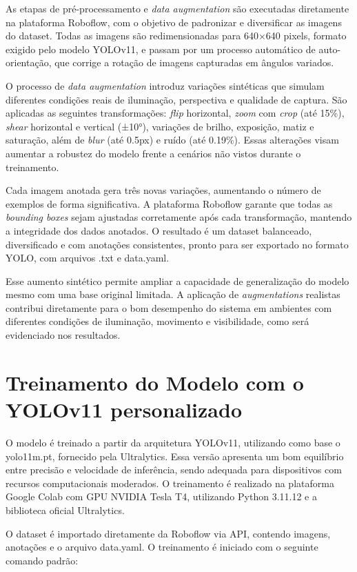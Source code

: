 As etapas de pré-processamento e \textit{data augmentation} são executadas diretamente na plataforma Roboflow, com o objetivo de padronizar e diversificar as imagens do dataset. Todas as imagens são redimensionadas para 640×640 pixels, formato exigido pelo modelo YOLOv11, e passam por um processo automático de auto-orientação, que corrige a rotação de imagens capturadas em ângulos variados.

O processo de \textit{data augmentation} introduz variações sintéticas que simulam diferentes condições reais de iluminação, perspectiva e qualidade de captura. São aplicadas as seguintes transformações: \textit{flip} horizontal, \textit{zoom} com \textit{crop} (até 15\%), \textit{shear} horizontal e vertical (±10°), variações de brilho, exposição, matiz e saturação, além de \textit{blur} (até 0.5px) e ruído (até 0.19\%). Essas alterações visam aumentar a robustez do modelo frente a cenários não vistos durante o treinamento.

Cada imagem anotada gera três novas variações, aumentando o número de exemplos de forma significativa. A plataforma Roboflow garante que todas as \textit{bounding boxes} sejam ajustadas corretamente após cada transformação, mantendo a integridade dos dados anotados. O resultado é um dataset balanceado, diversificado e com anotações consistentes, pronto para ser exportado no formato YOLO, com arquivos .txt e data.yaml.

Esse aumento sintético permite ampliar a capacidade de generalização do modelo mesmo com uma base original limitada. A aplicação de \textit{augmentations} realistas contribui diretamente para o bom desempenho do sistema em ambientes com diferentes condições de iluminação, movimento e visibilidade, como será evidenciado nos resultados.

\section{Treinamento do Modelo com o YOLOv11 personalizado}

O modelo é treinado a partir da arquitetura YOLOv11, utilizando como base o yolo11m.pt, fornecido pela Ultralytics. Essa versão apresenta um bom equilíbrio entre precisão e velocidade de inferência, sendo adequada para dispositivos com recursos computacionais moderados. O treinamento é realizado na plataforma Google Colab com GPU NVIDIA Tesla T4, utilizando Python 3.11.12 e a biblioteca oficial Ultralytics.

O dataset é importado diretamente da Roboflow via API, contendo imagens, anotações e o arquivo data.yaml. O treinamento é iniciado com o seguinte comando padrão:

